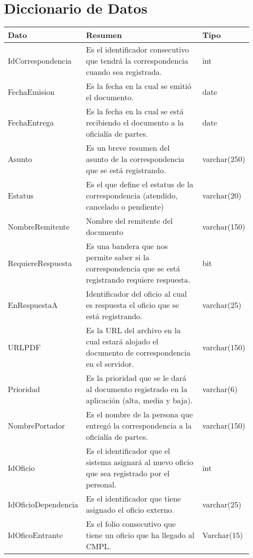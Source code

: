 \section{Diccionario de Datos}

\begin{table}[htbp!]
	\begin{center}
		\begin{tabular}{|l|l|l|}\hline
			\textbf{Dato} & \textbf{Resumen} & \textbf{Tipo} \\\hline
			IdCorrespondencia & Es el identificador consecutivo que tendrá la correspondencia cuando sea registrada. & int \\ \hline
			FechaEmision & Es la fecha en la cual se emitió el documento. & date \\\hline
			FechaEntrega & Es la fecha en la cual se está recibiendo el documento a la oficialía de partes. & date \\\hline
			Asunto & Es un breve resumen del asunto de la correspondencia que se está registrando. & varchar(250) \\\hline
			Estatus & Es el que define el estatus de la correspondencia (atendido, cancelado o pendiente) & varchar(20) \\\hline
			NombreRemitente & Nombre del remitente del documento & varchar(150) \\\hline
			RequiereRespuesta & Es una bandera que nos permite saber si la correspondencia que se está registrando requiere respuesta. & bit \\\hline
			EnRespuestaA & Identificador del oficio al cual es respuesta el oficio que se está registrando. & varchar(25) \\\hline
			URLPDF & Es la URL del archivo en la cual estará alojado el documento de correspondencia en el servidor.& varchar(150)\\\hline
			Prioridad & Es la prioridad que se le dará al documento registrado en la aplicación (alta, media y baja).&
varchar(6)\\\hline
			NombrePortador & Es el nombre de la persona que entregó la correspondencia a la oficialía de partes. &  varchar(150)\\\hline
			IdOficio & Es el identificador que el sistema asignará al nuevo oficio que sea registrado por el personal.
 & int \\\hline
 			IdOficioDependencia & Es el identificador que tiene asignado el oficio externo. & varchar(25)\\\hline
 			IdOficoEntrante & Es el folio consecutivo que tiene un oficio que ha llegado al CMPL. & Varchar(15)\\\hline

\end{tabular}
\end{center}
\end{table}

